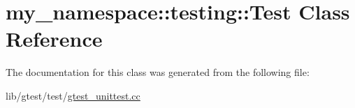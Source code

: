 \hypertarget{classmy__namespace_1_1testing_1_1_test}{\section{my\-\_\-namespace\-:\-:testing\-:\-:Test Class Reference}
\label{classmy__namespace_1_1testing_1_1_test}
}


The documentation for this class was generated from the following file\-:\begin{DoxyCompactItemize}
\item 
lib/gtest/test/\hyperlink{gtest__unittest_8cc}{gtest\-\_\-unittest.\-cc}\end{DoxyCompactItemize}
